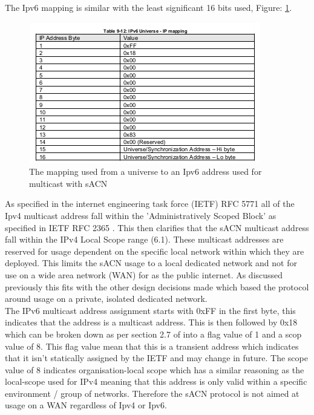 \documentclass[11pt,a4paper]{article}
\begin{document}
The Ipv6 mapping is similar with the least significant 16 bits used, Figure: \ref{IPV6_MULTICAST_MAPPING}.

\begin{figure}[H]
\label{IPV6_MULTICAST_MAPPING}
\includegraphics[width=\textwidth]{Ipv6MulticastMapping}
\caption{The mapping used from a universe to an Ipv6 address used for multicast with sACN}
\end{figure}

As specified in the internet engineering task force (IETF) RFC 5771 \cite{IETF_RFC_5771} all of the Ipv4 multicast address fall within the 'Administratively Scoped Block' as specified in IETF RFC 2365 \cite{IETF_RFC_2365}. This then clarifies that the sACN multicast address fall within the IPv4 Local Scope range (6.1). These multicast addresses are reserved for usage dependent on the specific local network within which they are deployed. This limits the sACN usage to a local dedicated network and not for use on a wide area network (WAN) for as the public internet. As discussed previously this fits with the other design decisions made which based the protocol around usage on a private, isolated dedicated network.\\

The IPv6 multicast address assignment starts with 0xFF in the first byte, this indicates that the address is a multicast address. This is then followed by 0x18 which can be broken down as per section 2.7 of \cite{IETF_RFC_4291} into a flag value of 1 and a scop value of 8. This flag value mean that this is a transient address which indicates that it isn't statically assigned by the IETF and may change in future. The scope value of 8 indicates organisation-local scope which has a similar reasoning as the local-scope used for IPv4 meaning that this address is only valid within a specific environment / group of networks. Therefore the sACN protocol is not aimed at usage on a WAN regardless of Ipv4 or Ipv6. 
\end{document}
